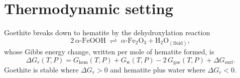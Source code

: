 

\section{Thermodynamic setting}
\label{sec:gt_thermo}

Goethite breaks down to hematite by the dehydroxylation reaction
\begin{equation}
  2\,\alpha\text{-FeOOH} \;\rightleftharpoons\; \alpha\text{-Fe}_2\text{O}_3 + \text{H}_2\text{O}_{(\text{fluid})},
  \label{eq:gt_rxn}
\end{equation}
whose Gibbs energy change, written per mole of hematite formed, is
\begin{equation}
  \Delta G_r(T,P) = G_{\mathrm{hem}}(T,P) + G_{\mathrm{w}}(T,P) - 2\,G_{\mathrm{goe}}(T,P) + \Delta G_{\mathrm{surf}} .
  \label{eq:gt_dGr}
\end{equation}
Goethite is stable where $\Delta G_r>0$ and hematite plus water where $\Delta G_r<0$.

